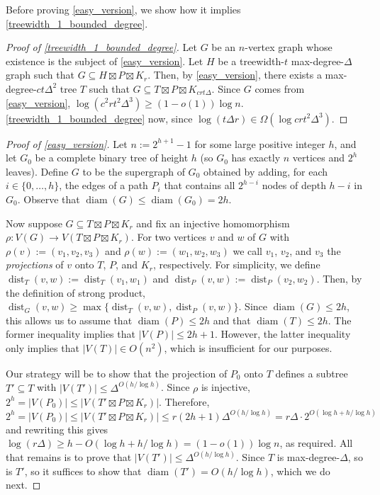 \documentclass{patmorin}
\newcommand{\defin}[1]{\emph{\color{brightmaroon}#1}}
\DeclareMathOperator{\dist}{dist}
\DeclareMathOperator{\diam}{diam}
\begin{document}
Before proving \cref{easy_version}, we show how it implies \cref{treewidth_1_bounded_degree}.

\begin{proof}[Proof of \cref{treewidth_1_bounded_degree}]
  Let $G$ be an $n$-vertex graph whose existence is the subject of \cref{easy_version}.  Let $H$ be a treewidth-$t$ max-degree-$\Delta$ graph such that $G\subseteq H\boxtimes P\boxtimes K_r$.  Then, by \cref{easy_version}, there exists a max-degree-$ct\Delta^2$ tree $T$ such that $G\subseteq T\boxtimes P\boxtimes K_{crt\Delta}$.  Since $G$ comes from \cref{easy_version}, $\log(c^2rt^2\Delta^3)\ge (1-o(1))\log n$. \cref{treewidth_1_bounded_degree} now, since $\log(t\Delta r)\in\Omega(\log crt^2\Delta^3)$.
\end{proof}

\begin{proof}[Proof of \cref{easy_version}]
  Let $n:=2^{h+1}-1$ for some large positive integer $h$, and let $G_0$ be a complete binary tree of height $h$ (so $G_0$ has exactly $n$ vertices and $2^h$ leaves).  Define $G$ to be the supergraph of $G_0$ obtained by adding, for each $i\in\{0,\ldots,h\}$, the edges of a path $P_i$ that contains all $2^{h-i}$ nodes of depth $h-i$ in $G_0$.  Observe that $\diam(G)\le\diam(G_0)=2h$.

  Now suppose $G\subseteq T\boxtimes P\boxtimes K_r$ and fix an injective homomorphism $\rho:V(G)\to V(T\boxtimes P\boxtimes K_r)$.  For two vertices $v$ and $w$ of $G$ with $\rho(v):=(v_1,v_2,v_3)$ and $\rho(w):=(w_1,w_2,w_3)$ we call $v_1$, $v_2$, and $v_3$ the \defin{projections} of $v$ onto $T$, $P$, and $K_r$, respectively.  For simplicity, we define $\dist_T(v,w):=\dist_T(v_1,w_1)$ and $\dist_P(v,w):=\dist_P(v_2,w_2)$.  Then, by the definition of strong product, $\dist_G(v,w)\ge \max\{\dist_T(v,w),\dist_P(v,w)\}$.  Since $\diam(G)\le 2h$, this allows us to assume that $\diam(P)\le 2h$ and that $\diam(T)\le 2h$.  The former inequality implies that $|V(P)|\le 2h+1$.  However, the latter inequality only implies that $|V(T)|\in O(n^2)$, which is insufficient for our purposes.

  Our strategy will be to show that the projection of $P_0$ onto $T$ defines a subtree $T'\subseteq T$ with $|V(T')|\le \Delta^{O(h/\log h)}$.  Since $\rho$ is injective, $2^h=|V(P_0)|\le |V(T'\boxtimes P\boxtimes K_r)|$. Therefore,
  \[
    2^h = |V(P_0)| \le |V(T'\boxtimes P\boxtimes K_r)| \le r(2h+1)\Delta^{O(h/\log h)} = r\Delta\cdot 2^{O(\log h + h/\log h)}
  \]
  and rewriting this gives $\log(r\Delta) \ge h-O(\log h+h/\log h)=(1-o(1))\log n$, as required.  All that remains is to prove that $|V(T')|\le\Delta^{O(h/\log h)}$.  Since $T$ is max-degree-$\Delta$, so is $T'$, so it suffices to show that $\diam(T')=O(h/\log h)$, which we do next.


\end{proof}
\end{document}
